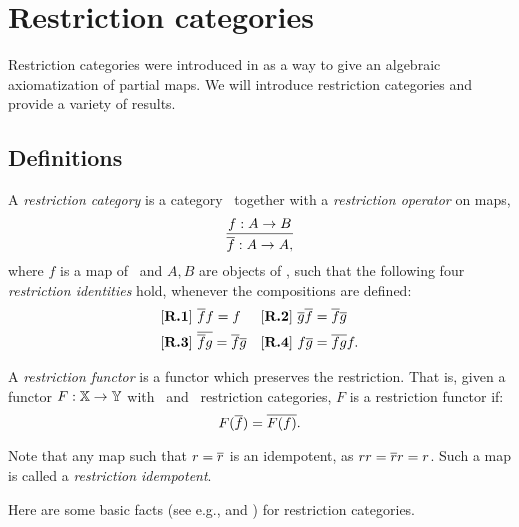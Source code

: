 
\chapter{Restriction categories} %
\label{chap:restriction_categories}


Restriction categories were introduced in
\cite{cockett2002:restcategories1,cockettlack2003:restcategories2,cockettlack2004:restcategories3}
as a way to give an algebraic axiomatization of partial maps. We will introduce restriction
categories and provide a variety of results.

\section{Definitions}
\label{sec:definitions}


\begin{definition}\label{def:restriction_category}
  A \emph{restriction category} is a category \X\ together with a \emph{restriction operator} on
  maps,
  \[
    \infer{\restr{f}:A\to A,}{f:A \to B}
  \]
  where $f$ is a map of \X\ and $A,B$ are objects of \X, such that the
  following four \emph{restriction identities} hold, whenever the
  compositions are defined:
  \begin{align*}
    &[\text{\bfseries {R}.{1}}]\ \overline{f} f = f & &
    [\text{\bfseries {R}.{2}}]\ \overline{g}  \overline{f} = \overline{f}  \overline{g}\\
    &[\text{\bfseries {R}.{3}}]\ \overline{\overline{f}  g} = \overline{f}   \overline{g} & &
    [\text{\bfseries {R}.{4}}]\  f \overline{g} = \overline{f g} f.
  \end{align*}
\end{definition}

\begin{definition}
  A \emph{restriction functor} is a functor which preserves the restriction. That is,
  given a functor $F: \mathbb{X} \to \mathbb{Y}$ with \X\  and \Y\ restriction categories,
  $F$ is a restriction functor if:
  \[
    F(\overline{f}) = \overline{F(f)}.
  \]
\end{definition}

Note that any map such that $r=\overline{r}$ is an idempotent, as $r r = \overline{r} r = r$.
Such a map is called a \emph{restriction idempotent}.

Here are some basic facts (see e.g., \cite{cockett2002:restcategories1} and
\cite{cockett-manes09-boolean-classical-rest-cats}) for restriction categories.

